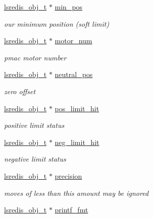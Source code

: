 \begin{DoxyCompactItemize}
\hyperlink{pgpmac_8h_ad449de06d02791adf2498d2a1e1f909c}{lsredis\-\_\-obj\-\_\-t} $\ast$ \hyperlink{structlspmac__motor__struct_a7c1f2f67c64d26b12d6bb0d681797d8d}{min\-\_\-pos}
\begin{DoxyCompactList}\small\item\em our minimum position (soft limit) \end{DoxyCompactList}\item 
\hyperlink{pgpmac_8h_ad449de06d02791adf2498d2a1e1f909c}{lsredis\-\_\-obj\-\_\-t} $\ast$ \hyperlink{structlspmac__motor__struct_ad6a51cca3c7e5f79168e5c33fd9e736b}{motor\-\_\-num}
\begin{DoxyCompactList}\small\item\em pmac motor number \end{DoxyCompactList}\item 
\hyperlink{pgpmac_8h_ad449de06d02791adf2498d2a1e1f909c}{lsredis\-\_\-obj\-\_\-t} $\ast$ \hyperlink{structlspmac__motor__struct_ae931e9bc9fc2fa82ca649334fc052fbe}{neutral\-\_\-pos}
\begin{DoxyCompactList}\small\item\em zero offset \end{DoxyCompactList}\item 
\hyperlink{pgpmac_8h_ad449de06d02791adf2498d2a1e1f909c}{lsredis\-\_\-obj\-\_\-t} $\ast$ \hyperlink{structlspmac__motor__struct_af39d2e7a681d7c2fbdc39d53fab1a475}{pos\-\_\-limit\-\_\-hit}
\begin{DoxyCompactList}\small\item\em positive limit status \end{DoxyCompactList}\item 
\hyperlink{pgpmac_8h_ad449de06d02791adf2498d2a1e1f909c}{lsredis\-\_\-obj\-\_\-t} $\ast$ \hyperlink{structlspmac__motor__struct_afe13c86941928d20357f4f3e2a4d915a}{neg\-\_\-limit\-\_\-hit}
\begin{DoxyCompactList}\small\item\em negative limit status \end{DoxyCompactList}\item 
\hyperlink{pgpmac_8h_ad449de06d02791adf2498d2a1e1f909c}{lsredis\-\_\-obj\-\_\-t} $\ast$ \hyperlink{structlspmac__motor__struct_a411f12c0ecdc481687d4fbbbec4c5510}{precision}
\begin{DoxyCompactList}\small\item\em moves of less than this amount may be ignored \end{DoxyCompactList}\item 
\hyperlink{pgpmac_8h_ad449de06d02791adf2498d2a1e1f909c}{lsredis\-\_\-obj\-\_\-t} $\ast$ \hyperlink{structlspmac__motor__struct_a25b13b65baf1b28c34012850809b0a3a}{printf\-\_\-fmt}

\end{DoxyCompactItemize}
